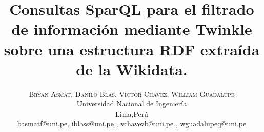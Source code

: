 \documentclass[conference]{IEEEtran}
\begin{document}
\title{\bf{Consultas SparQL para el filtrado de información mediante Twinkle sobre una estructura RDF extraída de la Wikidata. }}

\author{%
\textsc{Bryan Asmat}\textsc{, Danilo Blas}\textsc{, Victor Chavez}\textsc{, William Guadalupe}\\
\normalsize Universidad Nacional de Ingeniería \\ %
\normalsize Lima,Perú \\ %
\normalsize \href{mailto:basmatf@uni.pe}{basmatf@uni.pe},  \href{mailto:iblass@uni.pe}{iblass@uni.pe} \href{mailto:vchavezb@uni.pe}{,  vchavezb@uni.pe} \href{mailto:wguadalupeq@uni.pe}{,  wguadalupeq@uni.pe} %
}





\maketitle
\end{document}
